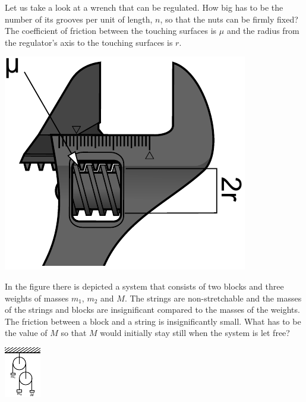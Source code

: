 \documentclass[11pt]{article}
\begin{document}

\probeng
Let us take a look at a wrench that can be regulated. How big has to be the number of its grooves per unit of length, $n$, so that the nuts can be firmly fixed? The coefficient of friction between the touching surfaces is $\mu$ and the radius from the regulator’s axis to the touching surfaces is $r$.
\begin{center}%
\includegraphics[width=0.4\linewidth]{2015-lahg-09-mutriv6ti_joonis}%
\end{center}
\probend
\bigskip


\probeng
In the figure there is depicted a system that consists of two blocks and three weights of masses $m_1$, $m_2$ and $M$. The strings are non-stretchable and the masses of the strings and blocks are insignificant compared to the masses of the weights. The friction between a block and a string is insignificantly small. What has to be the value of $M$ so that $M$ would initially stay still when the system is let free?
\begin{center}
	\includegraphics[width = 0.3\linewidth]  {2017-lahg-08-double_pulleys_img.pdf}
\end{center}
\probend
\bigskip
\end{document}
